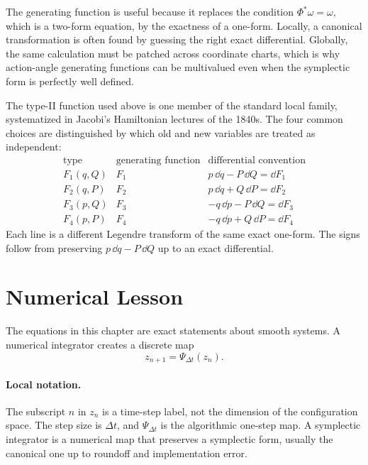 The generating function is useful because it replaces the condition
\(\Phi^*\omega=\omega\), which is a two-form equation, by the exactness of a
one-form. Locally, a canonical transformation is often found by guessing the
right exact differential. Globally, the same calculation must be patched across
coordinate charts, which is why action-angle generating functions can be
multivalued even when the symplectic form is perfectly well defined.

The type-II function used above is one member of the standard local family,
systematized in Jacobi's Hamiltonian lectures of the 1840s. The four common
choices are distinguished by which old and new variables are treated as
independent:
\[
\begin{array}{c|c|c}
\text{type} & \text{generating function} & \text{differential convention}\\
\hline
F_1(q,Q) & F_1 & p\,\dd q-P\,\dd Q=\dd F_1\\
F_2(q,P) & F_2 & p\,\dd q+Q\,\dd P=\dd F_2\\
F_3(p,Q) & F_3 & -q\,\dd p-P\,\dd Q=\dd F_3\\
F_4(p,P) & F_4 & -q\,\dd p+Q\,\dd P=\dd F_4
\end{array}
\]
Each line is a different Legendre transform of the same exact one-form.
The signs follow from preserving \(p\,\dd q-P\,\dd Q\) up to an exact
differential.

\section{Numerical Lesson}
\label{sec:numerical-lesson}

The equations in this chapter are exact statements about smooth systems. A
numerical integrator creates a discrete map
\[
  z_{n+1}=\Psi_{\Delta t}(z_n).
\]

\paragraph{Local notation.}
The subscript \(n\) in \(z_n\) is a time-step label, not the dimension of the
configuration space.  The step size is \(\Delta t\), and \(\Psi_{\Delta t}\)
is the algorithmic one-step map.  A symplectic integrator is a numerical map
that preserves a symplectic form, usually the canonical one up to roundoff and
implementation error.

